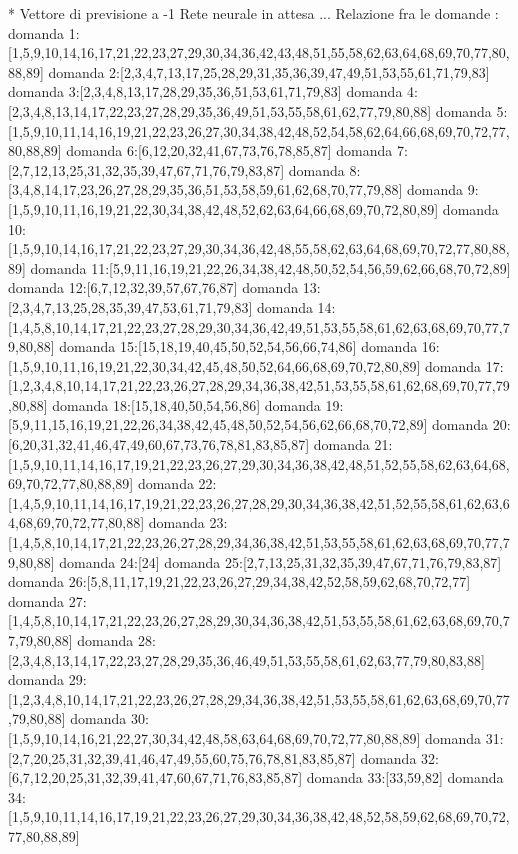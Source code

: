 * Vettore di previsione a -1
Rete neurale in attesa ...
Relazione fra le domande :
domanda 1:[1,5,9,10,14,16,17,21,22,23,27,29,30,34,36,42,43,48,51,55,58,62,63,64,68,69,70,77,80,88,89]
domanda 2:[2,3,4,7,13,17,25,28,29,31,35,36,39,47,49,51,53,55,61,71,79,83]
domanda 3:[2,3,4,8,13,17,28,29,35,36,51,53,61,71,79,83]
domanda 4:[2,3,4,8,13,14,17,22,23,27,28,29,35,36,49,51,53,55,58,61,62,77,79,80,88]
domanda 5:[1,5,9,10,11,14,16,19,21,22,23,26,27,30,34,38,42,48,52,54,58,62,64,66,68,69,70,72,77,80,88,89]
domanda 6:[6,12,20,32,41,67,73,76,78,85,87]
domanda 7:[2,7,12,13,25,31,32,35,39,47,67,71,76,79,83,87]
domanda 8:[3,4,8,14,17,23,26,27,28,29,35,36,51,53,58,59,61,62,68,70,77,79,88]
domanda 9:[1,5,9,10,11,16,19,21,22,30,34,38,42,48,52,62,63,64,66,68,69,70,72,80,89]
domanda 10:[1,5,9,10,14,16,17,21,22,23,27,29,30,34,36,42,48,55,58,62,63,64,68,69,70,72,77,80,88,89]
domanda 11:[5,9,11,16,19,21,22,26,34,38,42,48,50,52,54,56,59,62,66,68,70,72,89]
domanda 12:[6,7,12,32,39,57,67,76,87]
domanda 13:[2,3,4,7,13,25,28,35,39,47,53,61,71,79,83]
domanda 14:[1,4,5,8,10,14,17,21,22,23,27,28,29,30,34,36,42,49,51,53,55,58,61,62,63,68,69,70,77,79,80,88]
domanda 15:[15,18,19,40,45,50,52,54,56,66,74,86]
domanda 16:[1,5,9,10,11,16,19,21,22,30,34,42,45,48,50,52,64,66,68,69,70,72,80,89]
domanda 17:[1,2,3,4,8,10,14,17,21,22,23,26,27,28,29,34,36,38,42,51,53,55,58,61,62,68,69,70,77,79,80,88]
domanda 18:[15,18,40,50,54,56,86]
domanda 19:[5,9,11,15,16,19,21,22,26,34,38,42,45,48,50,52,54,56,62,66,68,70,72,89]
domanda 20:[6,20,31,32,41,46,47,49,60,67,73,76,78,81,83,85,87]
domanda 21:[1,5,9,10,11,14,16,17,19,21,22,23,26,27,29,30,34,36,38,42,48,51,52,55,58,62,63,64,68,69,70,72,77,80,88,89]
domanda 22:[1,4,5,9,10,11,14,16,17,19,21,22,23,26,27,28,29,30,34,36,38,42,51,52,55,58,61,62,63,64,68,69,70,72,77,80,88]
domanda 23:[1,4,5,8,10,14,17,21,22,23,26,27,28,29,34,36,38,42,51,53,55,58,61,62,63,68,69,70,77,79,80,88]
domanda 24:[24]
domanda 25:[2,7,13,25,31,32,35,39,47,67,71,76,79,83,87]
domanda 26:[5,8,11,17,19,21,22,23,26,27,29,34,38,42,52,58,59,62,68,70,72,77]
domanda 27:[1,4,5,8,10,14,17,21,22,23,26,27,28,29,30,34,36,38,42,51,53,55,58,61,62,63,68,69,70,77,79,80,88]
domanda 28:[2,3,4,8,13,14,17,22,23,27,28,29,35,36,46,49,51,53,55,58,61,62,63,77,79,80,83,88]
domanda 29:[1,2,3,4,8,10,14,17,21,22,23,26,27,28,29,34,36,38,42,51,53,55,58,61,62,63,68,69,70,77,79,80,88]
domanda 30:[1,5,9,10,14,16,21,22,27,30,34,42,48,58,63,64,68,69,70,72,77,80,88,89]
domanda 31:[2,7,20,25,31,32,39,41,46,47,49,55,60,75,76,78,81,83,85,87]
domanda 32:[6,7,12,20,25,31,32,39,41,47,60,67,71,76,83,85,87]
domanda 33:[33,59,82]
domanda 34:[1,5,9,10,11,14,16,17,19,21,22,23,26,27,29,30,34,36,38,42,48,52,58,59,62,68,69,70,72,77,80,88,89]
